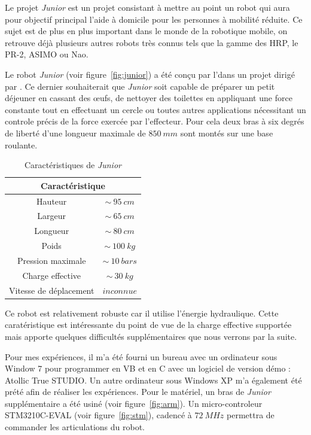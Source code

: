 Le projet \emph{Junior} est un projet consistant \`a mettre au point un robot qui aura pour objectif principal l'aide \`a domicile pour les personnes \`a mobilit\'e r\'eduite. Ce sujet est de plus en plus important dans le monde de la robotique mobile, on retrouve d\'ej\`a plusieurs autres robots tr\`es connus tels que la gamme des HRP, le PR-2, ASIMO ou Nao.

Le robot \emph{Junior} (voir figure~\ref{fig:junior}) a \'et\'e con\c{c}u par l'\umassey dans un projet dirig\'e par \rory. Ce dernier souhaiterait que \emph{Junior} soit capable de pr\'eparer un petit d\'ejeuner en cassant des {\oe}ufs, de nettoyer des toilettes en appliquant une force constante tout en effectuant un cercle ou toutes autres applications n\'ecessitant un controle pr\'ecis de la force exerc\'ee par l'effecteur.
Pour cela deux bras \`a six degr\'es de libert\'e d'une longueur maximale de $850~mm$ sont mont\'es sur une base roulante.


\begin{table}[h]
	\begin{center}
		\begin{tabular}{|c|c|}
		\hline
		\multicolumn{2}{|c|}{Caract\'eristique}\\
		\hline
		Hauteur & $\sim~95~cm$\\
		Largeur & $\sim~65~cm$\\
		Longueur & $\sim~80~cm$\\
		Poids & $\sim~100~kg$\\
		Pression maximale & $\sim~10~bars$\\
		Charge effective & $\sim~30~kg$\\
		Vitesse de d\'eplacement & $inconnue$\\
		\hline
		\end{tabular}
	\end{center}
	\caption{Caract\'eristiques de \emph{Junior}}
\end{table}

Ce robot est relativement robuste car il utilise l'\'energie hydraulique. Cette carat\'eristique est int\'eressante du point de vue de la charge effective support\'ee mais apporte quelques difficult\'es suppl\'ementaires que nous verrons par la suite.
\newpage

Pour mes exp\'eriences, il m'a \'et\'e fourni un bureau avec un ordinateur sous Window 7 pour programmer en VB et en C avec un logiciel de version d\'emo : Atollic True STUDIO.
Un autre ordinateur sous Windows XP m'a \'egalement \'et\'e pr\'et\'e afin de r\'ealiser les exp\'eriences.
Pour le mat\'eriel, un bras de \emph{Junior} suppl\'ementaire a \'et\'e usin\'e (voir figure~\ref{fig:arm}). Un micro-controleur STM3210C-EVAL (voir figure~\ref{fig:stm}), cadenc\'e \`a $72~MHz$ permettra de commander les articulations du robot. 
\saut



